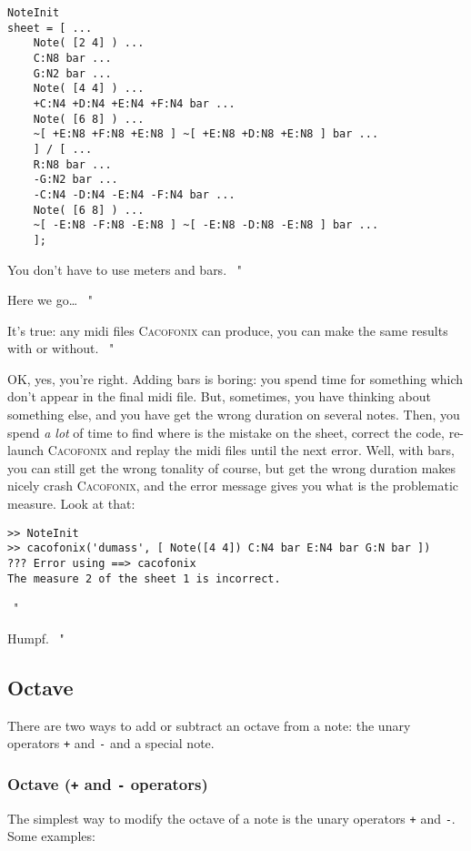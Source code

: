 \documentclass{article}
\newcommand\cacofonix{\textsc{Cacofonix}\xspace}
\newenvironment{meenv}{ \par \noindent \makebox[6em][r]{ \textcolor{mecolor}{Me}: " --~}}{~"}
\newenvironment{myselfenv}{ \par \noindent \makebox[6em][r]{ \textcolor{myselfcolor}{Myself}: " --~}}{~"}
\newcommand{ \me }[1]{%
\begin{meenv}%
	#1%
\end{meenv} }
\newcommand{ \myself }[1]{%
\begin{myselfenv}%
	#1%
\end{myselfenv} }
\begin{document}
\begin{lstlisting}
NoteInit
sheet = [ ...
	Note( [2 4] ) ...
	C:N8 bar ...
	G:N2 bar ...
	Note( [4 4] ) ...
	+C:N4 +D:N4 +E:N4 +F:N4 bar ...
	Note( [6 8] ) ...
	~[ +E:N8 +F:N8 +E:N8 ] ~[ +E:N8 +D:N8 +E:N8 ] bar ...
	] / [ ...
	R:N8 bar ...
	-G:N2 bar ...
	-C:N4 -D:N4 -E:N4 -F:N4 bar ...
	Note( [6 8] ) ...
	~[ -E:N8 -F:N8 -E:N8 ] ~[ -E:N8 -D:N8 -E:N8 ] bar ...
	];
\end{lstlisting}

\me{You don't have to use meters and bars.}
\myself{Here we go\dots}
\me{It's true: any midi files \cacofonix can produce, you can make the same results with or without.}
\begin{myselfenv}%
	OK, yes, you're right. Adding bars is boring: you spend time for something which don't appear in the final midi file. But, sometimes, you have thinking about something else, and you have get the wrong duration on several notes. Then, you spend \emph{a lot} of time to find where is the mistake on the sheet, correct the code, re-launch \cacofonix and replay the midi files until the next error. Well, with bars, you can still get the wrong tonality of course, but get the wrong duration makes nicely crash \cacofonix, and the error message gives you what is the problematic measure. Look at that:
\begin{lstlisting}
>> NoteInit
>> cacofonix('dumass', [ Note([4 4]) C:N4 bar E:N4 bar G:N bar ])
??? Error using ==> cacofonix
The measure 2 of the sheet 1 is incorrect.
\end{lstlisting}%
\end{myselfenv}
\me{Humpf.}

\subsection{Octave}
\label{sec:Octave}

There are two ways to add or subtract an octave from a note: the unary operators \lstinline!+! and \lstinline!-! and a special note.

\subsubsection{Octave (\lstinline!+! and \lstinline!-! operators)}
\label{sec:OctaveOperators}

The simplest way to modify the octave of a note is the unary operators \lstinline!+! and \lstinline!-!. Some examples: \\
\end{document}
